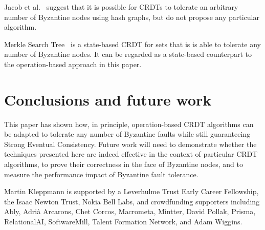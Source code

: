 \documentclass[sigplan,review]{acmart}
\begin{document}
Jacob et al.~\cite{Jacob:2021} suggest that it is possible for CRDTs to tolerate an arbitrary number of Byzantine nodes using hash graphs, but do not propose any particular algorithm.

Merkle Search Tree~\cite{Auvolat:2019} is a state-based CRDT for sets that is is able to tolerate any number of Byzantine nodes.
It can be regarded as a state-based counterpart to the operation-based approach in this paper.

\section{Conclusions and future work}\label{sec:conclusions}

This paper has shown how, in principle, operation-based CRDT algorithms can be adapted to tolerate any number of Byzantine faults while still guaranteeing Strong Eventual Consistency.
Future work will need to demonstrate whether the techniques presented here are indeed effective in the context of particular CRDT algorithms, to prove their correctness in the face of Byzantine nodes, and to measure the performance impact of Byzantine fault tolerance.

\begin{acks}
Martin Kleppmann is supported by a Leverhulme Trust Early Career Fellowship, the Isaac Newton Trust, Nokia Bell Labs, and crowdfunding supporters including Ably, Adrià Arcarons, Chet Corcos, Macrometa, Mintter, David Pollak, Prisma, RelationalAI, SoftwareMill, Talent Formation Network, and Adam Wiggins.
\end{acks}



\end{document}
